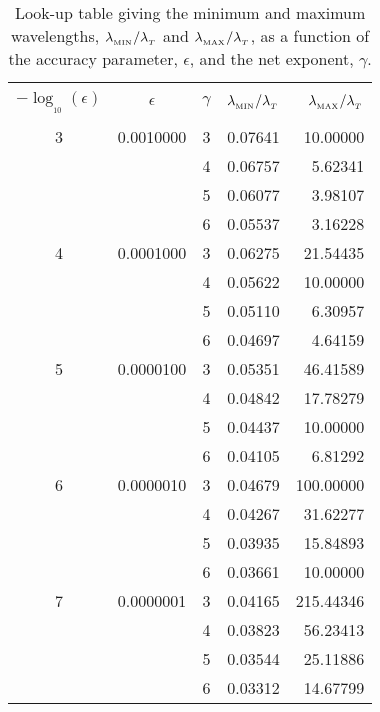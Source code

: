 \documentclass[usenatbib]{mn2e}
\numberwithin{equation}{section}
\begin{document}
\begin{table}
\begin{center}
\begin{tabular}{|cc|crr|}\hline\hline
 & & & & \\
$-\log_{_{10}}(\epsilon)$ & $\epsilon$ & $\gamma$ & $\lambda_{_{\rm MIN}}/\lambda_{_T}$ & $\lambda_{_{\rm MAX}}/\lambda_{_T}$ \\
 & & & & \\\hline\hline
3 & 0.0010000 & 3 & 0.07641 & 10.00000 \\
 & & 4 & 0.06757 & 5.62341 \\
 & & 5 & 0.06077 & 3.98107 \\
 & & 6 & 0.05537 & 3.16228 \\\hline
4 & 0.0001000 & 3 & 0.06275 & 21.54435 \\
 & & 4 & 0.05622 & 10.00000 \\
 & & 5 & 0.05110 & 6.30957 \\
 & & 6 & 0.04697 & 4.64159 \\\hline
 5 & 0.0000100 & 3 & 0.05351 & 46.41589 \\
 & & 4 & 0.04842 & 17.78279 \\
 & & 5 & 0.04437 & 10.00000 \\
 & & 6 & 0.04105 & 6.81292 \\\hline
 6 & 0.0000010 & 3 & 0.04679 & 100.00000 \\
 & & 4 & 0.04267 & 31.62277 \\
 & & 5 & 0.03935 & 15.84893 \\
 & & 6 & 0.03661 & 10.00000 \\\hline
 7 & 0.0000001 & 3 & 0.04165 & 215.44346 \\
 & & 4 & 0.03823 & 56.23413 \\
 & & 5 & 0.03544 & 25.11886 \\
 & & 6 & 0.03312 & 14.67799 \\\hline\hline
\end{tabular}
\end{center}
\label{TAB:LambdaRange}
\caption{Look-up table giving the minimum and maximum wavelengths, $\lambda_{_{\rm MIN}}/\lambda_{_T}$ and $\lambda_{_{\rm MAX}}/\lambda_{_T}$, as a function of the accuracy parameter, $\epsilon$, and the net exponent, $\gamma$.}
\end{table}
\end{document}
